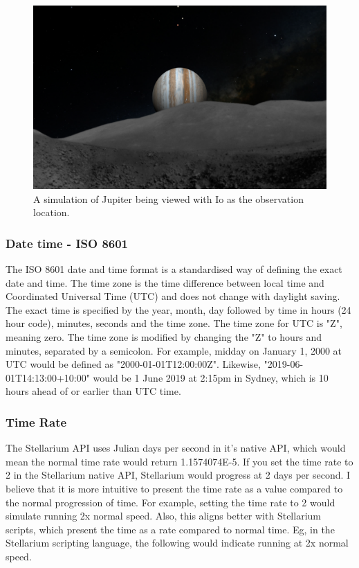 \begin{figure}[ht]
	\centerline{\includegraphics[width=1\columnwidth]{JupiterFromIO.png}}
	\caption{\label{fig_JupiterFromIO}{A simulation of Jupiter being viewed with Io as the observation location.}}
\end{figure}

\subsubsection{Date time - ISO 8601}
The ISO 8601 date and time format is a standardised way of defining the exact date and time. The time zone is the time difference between local time and Coordinated Universal Time (UTC) and does not change with daylight saving. The exact time is specified by the year, month, day followed by time in hours (24 hour code), minutes, seconds and the time zone.  The time zone for UTC is "Z", meaning zero. The time zone is modified by changing the "Z" to hours and minutes, separated by a semicolon. For example,  midday on January 1, 2000 at UTC would be defined as "2000-01-01T12:00:00Z". Likewise, "2019-06-01T14:13:00+10:00" would be 1 June 2019 at 2:15pm in Sydney, which is 10 hours ahead of or earlier than UTC time. 

\subsubsection{Time Rate}\label{subsec:timerate}
The Stellarium API uses Julian days per second in it's native API, which would mean the normal time rate would return 1.1574074E-5. If you set the time rate to 2 in the Stellarium native  API, Stellarium would progress at 2 days per second. 
I believe that it is more intuitive to present the time rate as a value compared to the normal progression of time. For example, setting the time rate to 2 would simulate running 2x normal speed. Also, this aligns better with Stellarium scripts, which present the time as a rate compared to normal time. Eg, in the Stellarium scripting language, the following would indicate running at 2x normal speed.

